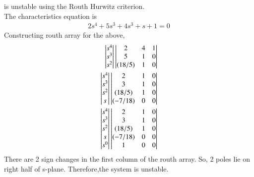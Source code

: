 \begin{enumerate}[label=\thesubsection.\arabic*.,ref=\thesubsection.\theenumi]
%
is unstable using the Routh Hurwitz criterion.
\\
\solution 
The characteristics equation is 
\begin{align}
2s^4 + 5s^3 + 4s^3 + s + 1 = 0 
\end{align}
Constructing routh array for the above,
\begin{align}
\begin{vmatrix}s^4\\s^3\\s^2\end{vmatrix}
\begin{vmatrix}2 & 4 & 1 \\ 5 & 1 & 0 \\ (18/5) & 1 & 0\end{vmatrix}
\\
\begin{vmatrix}s^4\\s^3\\s^2\\s\end{vmatrix}
\begin{vmatrix}2 & 1 & 0 \\ 3 & 1 & 0 \\ (18/5) & 1 & 0 \\ (-7/18) & 0 & 0\end{vmatrix}
\\
\begin{vmatrix}s^4\\s^3\\s^2\\s\\s^0\end{vmatrix}
\begin{vmatrix}2 & 1 & 0 \\ 3 & 1 & 0 \\ (18/5) & 1 & 0 \\ (-7/18) & 0 & 0 \\ 1 & 0 & 0\end{vmatrix}
\end{align}
%
There are 2 sign changes in the first column of the routh array. So, 2 poles lie on right half of s-plane.
Therefore,the system is unstable.
%
\end{enumerate}


